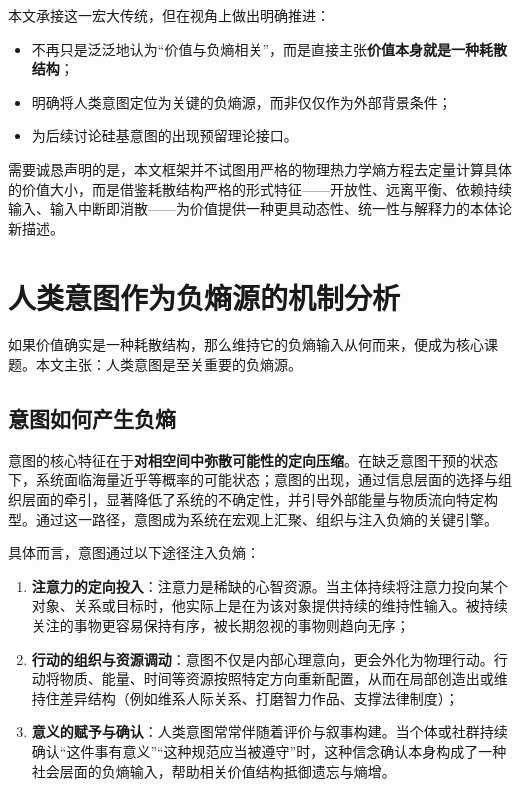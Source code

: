 \documentclass[11pt,a4paper]{ctexart}
\begin{document}
本文承接这一宏大传统，但在视角上做出明确推进：
\begin{itemize}
    \item 不再只是泛泛地认为“价值与负熵相关”，而是直接主张\textbf{价值本身就是一种耗散结构}；
    \item 明确将人类意图定位为关键的负熵源，而非仅仅作为外部背景条件；
    \item 为后续讨论硅基意图的出现预留理论接口。
\end{itemize}

需要诚恳声明的是，本文框架并不试图用严格的物理热力学熵方程去定量计算具体的价值大小，而是借鉴耗散结构严格的形式特征——开放性、远离平衡、依赖持续输入、输入中断即消散——为价值提供一种更具动态性、统一性与解释力的本体论新描述。

\section{人类意图作为负熵源的机制分析}

如果价值确实是一种耗散结构，那么维持它的负熵输入从何而来，便成为核心课题。本文主张：人类意图是至关重要的负熵源。

\subsection{意图如何产生负熵}
意图的核心特征在于\textbf{对相空间中弥散可能性的定向压缩}。在缺乏意图干预的状态下，系统面临海量近乎等概率的可能状态；意图的出现，通过信息层面的选择与组织层面的牵引，显著降低了系统的不确定性，并引导外部能量与物质流向特定构型。通过这一路径，意图成为系统在宏观上汇聚、组织与注入负熵的关键引擎。

具体而言，意图通过以下途径注入负熵：
\begin{enumerate}
    \item \textbf{注意力的定向投入}：注意力是稀缺的心智资源。当主体持续将注意力投向某个对象、关系或目标时，他实际上是在为该对象提供持续的维持性输入。被持续关注的事物更容易保持有序，被长期忽视的事物则趋向无序；
    \item \textbf{行动的组织与资源调动}：意图不仅是内部心理意向，更会外化为物理行动。行动将物质、能量、时间等资源按照特定方向重新配置，从而在局部创造出或维持住差异结构（例如维系人际关系、打磨智力作品、支撑法律制度）；
    \item \textbf{意义的赋予与确认}：人类意图常常伴随着评价与叙事构建。当个体或社群持续确认“这件事有意义”“这种规范应当被遵守”时，这种信念确认本身构成了一种社会层面的负熵输入，帮助相关价值结构抵御遗忘与熵增。
\end{enumerate}
\end{document}
